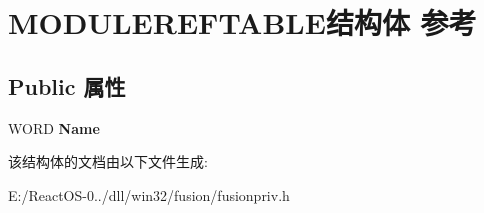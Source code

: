 \hypertarget{struct_m_o_d_u_l_e_r_e_f_t_a_b_l_e}{}\section{M\+O\+D\+U\+L\+E\+R\+E\+F\+T\+A\+B\+L\+E结构体 参考}
\label{struct_m_o_d_u_l_e_r_e_f_t_a_b_l_e}
\subsection*{Public 属性}
\begin{DoxyCompactItemize}
\item 
\mbox{\label{struct_m_o_d_u_l_e_r_e_f_t_a_b_l_e_aa7e0b7cdada017cb665e979417c03067}} 
W\+O\+RD {\bfseries Name}
\end{DoxyCompactItemize}


该结构体的文档由以下文件生成\+:\begin{DoxyCompactItemize}
\item 
E\+:/\+React\+O\+S-\/0../dll/win32/fusion/fusionpriv.\+h\end{DoxyCompactItemize}
